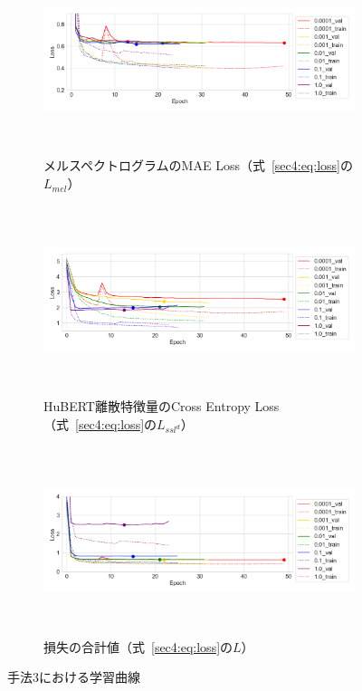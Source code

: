 \documentclass[12pt]{jarticle}
\numberwithin{equation}{section}    %
\numberwithin{figure}{section}      %
\numberwithin{table}{section}      %
\begin{document}
\begin{figure}[bt]
    \centering
    \begin{subfigure}{\linewidth}
        \centering
        \includegraphics[height=55mm]{./figure/sec4/learning_curves/3/mel_loss.png}
        \caption{メルスペクトログラムのMAE Loss（式~\eqref{sec4:eq:loss}の$L_{mel}$）}
        \label{sec4:fig:learning_curve_method_3_val_mel_loss}
    \end{subfigure}
    \begin{subfigure}{\linewidth}
        \centering
        \includegraphics[height=55mm]{./figure/sec4/learning_curves/3/ssl_feature_cluster_loss.png}
        \caption{HuBERT離散特徴量のCross Entropy Loss（式~\eqref{sec4:eq:loss}の$L_{ssl^{d}}$）}
        \label{sec4:fig:learning_curve_method_3_val_ssl_feature_cluster_loss}
    \end{subfigure}
    \begin{subfigure}{\linewidth}
        \centering
        \includegraphics[height=55mm]{./figure/sec4/learning_curves/3/total_loss.png}
        \caption{損失の合計値（式~\eqref{sec4:eq:loss}の$L$）}
        \label{sec4:fig:learning_curve_method_3_val_total_loss}
    \end{subfigure}
    \caption{手法3における学習曲線}
    \label{sec4:fig:learning_curve_method_3_val_losses}
\end{figure}
\end{document}
